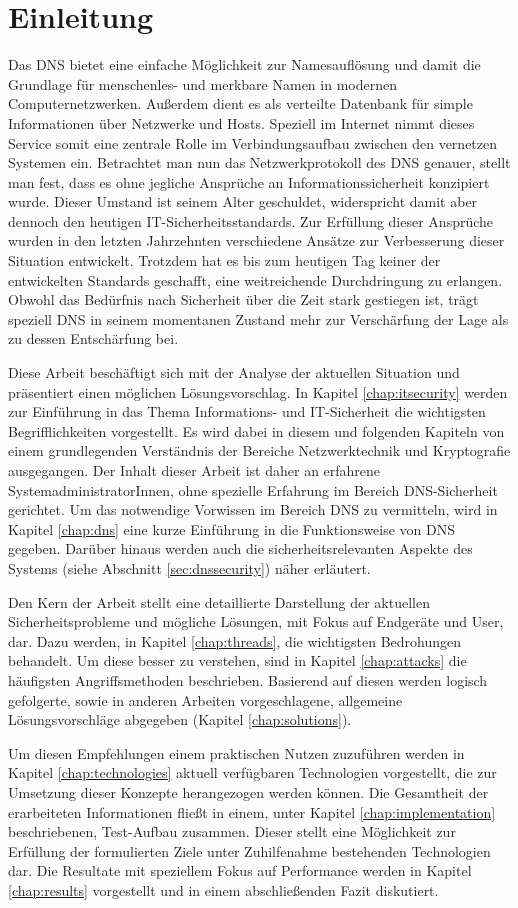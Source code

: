 \chapter{Einleitung}
Das \ac{DNS} bietet eine einfache Möglichkeit zur Namesauflösung und damit die Grundlage für menschenles- und merkbare Namen in modernen Computernetzwerken. Außerdem dient es als verteilte Datenbank für simple Informationen über Netzwerke und Hosts. Speziell im Internet nimmt dieses Service somit eine zentrale Rolle im Verbindungsaufbau zwischen den vernetzen Systemen ein. Betrachtet man nun das Netzwerkprotokoll des DNS genauer, stellt man fest, dass es ohne jegliche Ansprüche an Informationssicherheit konzipiert wurde. Dieser Umstand ist seinem Alter geschuldet, widerspricht damit aber dennoch den heutigen IT-Sicherheitsstandards. Zur Erfüllung dieser Ansprüche wurden in den letzten Jahrzehnten verschiedene Ansätze zur Verbesserung dieser Situation entwickelt. Trotzdem hat es bis zum heutigen Tag keiner der entwickelten Standards geschafft, eine weitreichende Durchdringung zu erlangen. Obwohl das Bedürfnis nach Sicherheit über die Zeit stark gestiegen ist, trägt speziell DNS in seinem momentanen Zustand mehr zur Verschärfung der Lage als zu dessen Entschärfung bei.

Diese Arbeit beschäftigt sich mit der Analyse der aktuellen Situation und präsentiert einen möglichen Lösungsvorschlag. In Kapitel \ref{chap:itsecurity} werden zur Einführung in das Thema Informations- und IT-Sicherheit die wichtigsten Begrifflichkeiten vorgestellt. Es wird dabei in diesem und folgenden Kapiteln von einem grundlegenden Verständnis der Bereiche Netzwerktechnik und Kryptografie ausgegangen. Der Inhalt dieser Arbeit ist daher an erfahrene SystemadministratorInnen, ohne spezielle Erfahrung im Bereich DNS-Sicherheit gerichtet. Um das notwendige Vorwissen im Bereich DNS zu vermitteln, wird in Kapitel \ref{chap:dns} eine kurze Einführung in die Funktionsweise von DNS gegeben. Darüber hinaus werden auch die sicherheitsrelevanten Aspekte des Systems (siehe Abschnitt \ref{sec:dnssecurity}) näher erläutert. 

Den Kern der Arbeit stellt eine detaillierte Darstellung der aktuellen Sicherheitsprobleme und mögliche Lösungen, mit Fokus auf Endgeräte und User, dar. Dazu werden, in Kapitel \ref{chap:threads}, die wichtigsten Bedrohungen behandelt. Um diese besser zu verstehen, sind in Kapitel \ref{chap:attacks} die häufigsten Angriffsmethoden beschrieben. Basierend auf diesen werden logisch gefolgerte, sowie in anderen Arbeiten vorgeschlagene, allgemeine Lösungsvorschläge abgegeben (Kapitel \ref{chap:solutions}). 

Um diesen Empfehlungen einem praktischen Nutzen zuzuführen werden in Kapitel \ref{chap:technologies} aktuell verfügbaren Technologien vorgestellt, die zur Umsetzung dieser Konzepte herangezogen werden können. Die Gesamtheit der erarbeiteten Informationen fließt in einem, unter Kapitel \ref{chap:implementation} beschriebenen, Test-Aufbau zusammen. Dieser stellt eine Möglichkeit zur Erfüllung der formulierten Ziele unter Zuhilfenahme bestehenden Technologien dar. Die Resultate mit speziellem Fokus auf Performance werden in Kapitel \ref{chap:results} vorgestellt und in einem abschließenden Fazit diskutiert.
